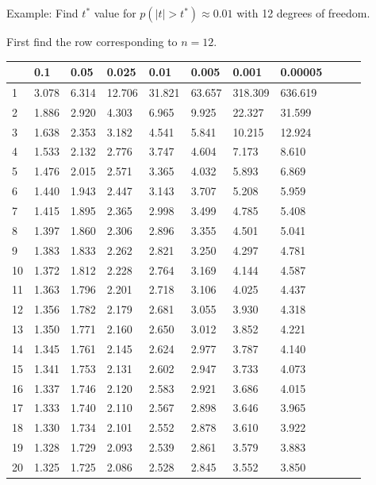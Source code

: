\begin{frame}{\small Example: Find $t^*$ value for $p(|t|>t^*)
\approx 0.01$ with 12 degrees of freedom.}
  
{\small First find the row corresponding to $n=12$.}

  {
\fontsize{5pt}{5pt}
\selectfont

\begin{tabular}{l|llllllllll}
 & 0.1&0.05&0.025&0.01&0.005&0.001&0.00005\\ \hline
 1 & 3.078 & 6.314 & 12.706 & 31.821 & 63.657 & 318.309 & 636.619 \\ 
 2 & 1.886 & 2.920 & 4.303 & 6.965 & 9.925 & 22.327 & 31.599 \\ 
 3 & 1.638 & 2.353 & 3.182 & 4.541 & 5.841 & 10.215 & 12.924 \\ 
 4 & 1.533 & 2.132 & 2.776 & 3.747 & 4.604 & 7.173 & 8.610 \\ 
 5 & 1.476 & 2.015 & 2.571 & 3.365 & 4.032 & 5.893 & 6.869 \\ 
[5pt]
 6 & 1.440 & 1.943 & 2.447 & 3.143 & 3.707 & 5.208 & 5.959 \\ 
 7 & 1.415 & 1.895 & 2.365 & 2.998 & 3.499 & 4.785 & 5.408 \\ 
 8 & 1.397 & 1.860 & 2.306 & 2.896 & 3.355 & 4.501 & 5.041 \\ 
 9 & 1.383 & 1.833 & 2.262 & 2.821 & 3.250 & 4.297 & 4.781 \\ 
10 & 1.372 & 1.812 & 2.228 & 2.764 & 3.169 & 4.144 & 4.587 \\ 
[5pt]
11 & 1.363 & 1.796 & 2.201 & 2.718 & 3.106 & 4.025 & 4.437 \\ 
\rowcolor{red}12 & 1.356 & 1.782 & 2.179 & 2.681 & 3.055 & 3.930 & 4.318 \\ 
13 & 1.350 & 1.771 & 2.160 & 2.650 & 3.012 & 3.852 & 4.221 \\ 
14 & 1.345 & 1.761 & 2.145 & 2.624 & 2.977 & 3.787 & 4.140 \\ 
15 & 1.341 & 1.753 & 2.131 & 2.602 & 2.947 & 3.733 & 4.073 \\ 
[5pt]
16 & 1.337 & 1.746 & 2.120 & 2.583 & 2.921 & 3.686 & 4.015 \\ 
17 & 1.333 & 1.740 & 2.110 & 2.567 & 2.898 & 3.646 & 3.965 \\ 
18 & 1.330 & 1.734 & 2.101 & 2.552 & 2.878 & 3.610 & 3.922 \\ 
19 & 1.328 & 1.729 & 2.093 & 2.539 & 2.861 & 3.579 & 3.883 \\ 
20 & 1.325 & 1.725 & 2.086 & 2.528 & 2.845 & 3.552 & 3.850 \\ 

\end{tabular}}
\end{frame}
